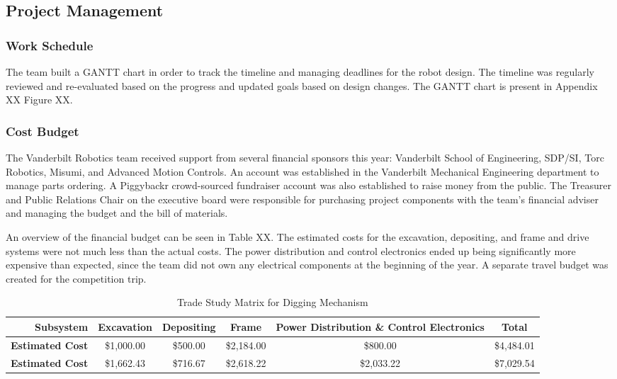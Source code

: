 \documentclass[class=article, crop=false]{standalone}
\begin{document}
	\subsection{Project Management}
	\label{subsec:project_management}
	
	\subsubsection{Work Schedule}
	The team built a GANTT chart in order to track the timeline and managing deadlines for the robot design. The timeline was regularly reviewed and re-evaluated based on the progress and updated goals based on design changes. The GANTT chart is present in Appendix XX Figure XX.

	
	\subsubsection{Cost Budget}
	
	The Vanderbilt Robotics team received support from several financial sponsors this year: Vanderbilt School of Engineering, SDP/SI, Torc Robotics, Misumi, and Advanced Motion Controls. An account was established in the Vanderbilt Mechanical Engineering department to manage parts ordering. A Piggybackr crowd-sourced fundraiser account was also established to raise money from the public. The Treasurer and Public Relations Chair on the executive board were responsible for purchasing project components with the team’s financial adviser and managing the budget and the bill of materials. 
	
	An overview of the financial budget can be seen in Table XX. The estimated costs for the excavation, depositing, and frame and drive systems were not much less than the actual costs. The power distribution and control electronics ended up being significantly more expensive than expected, since the team did not own any electrical components at the beginning of the year. A separate travel budget was created for the competition trip. 
	
	\FloatBarrier
	\begin{table}[h]
	\scriptsize
	\centering
	\begin{tabular}{ | r | c | c | c | c | c | }
 	\hline		
 	\rowcolor[gray]{0.8}
 		\textbf{Subsystem} & \textbf{Excavation} & \textbf{Depositing} & \textbf{Frame} & \textbf{Power Distribution \& Control Electronics} & \textbf{Total} \\
 		\hline\hline
 		\textbf{Estimated Cost} & \$1,000.00 & \$500.00 & \$2,184.00 & \$800.00 &  \$4,484.01 \\
	\hline
		\textbf{Estimated Cost} & \$1,662.43 & \$716.67 & \$2,618.22 & \$2,033.22 & \$7,029.54 \\
	\hline
	\end{tabular}
	\caption{Trade Study Matrix for Digging Mechanism}
		\label{table:cost_budget}
	\end{table}
	\FloatBarrier
	
\end{document}
